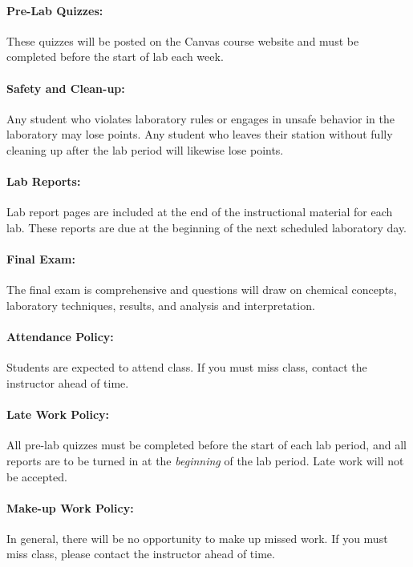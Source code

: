 \documentclass[12pt, letterpaper]{article}
\begin{document}
\paragraph{Pre-Lab Quizzes:}
These quizzes will be posted on the Canvas course website and must be completed before the start of lab each week.

\paragraph{Safety and Clean-up:}
Any student who violates laboratory rules or engages in unsafe behavior in the laboratory may lose points. Any student who leaves their station without fully cleaning up after the lab period will likewise lose points.

\paragraph{Lab Reports:}
Lab report pages are included at the end of the instructional material for each lab. These reports are due at the beginning of the next scheduled laboratory day.

\paragraph{Final Exam:}
The final exam is comprehensive and questions will draw on chemical concepts, laboratory techniques, results, and analysis and interpretation.

\paragraph{Attendance Policy:}
Students are expected to attend class. If you must miss class, contact the instructor ahead of time.

\paragraph{Late Work Policy:}
All pre-lab quizzes must be completed before the start of each lab period, and all reports are to be turned in at the \emph{beginning} of the lab period. Late work will not be accepted.

\paragraph{Make-up Work Policy:}
In general, there will be no opportunity to make up missed work. If you must miss class, please contact the instructor ahead of time.
\end{document}
